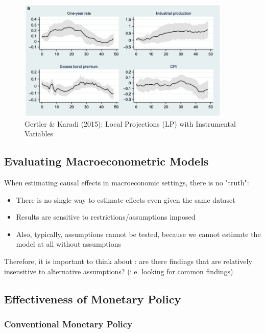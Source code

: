             \begin{figure}[H]
                \centering
                \includegraphics[width=4in]{images/ch8/mp_Gertler_LP.png}
                \caption{Gertler \& Karadi (2015): Local Projections (LP) with Instrumental Variables}
            \end{figure}
            
        \subsection{Evaluating Macroeconometric Models}
            When estimating causal effects in macroeconomic settings, there is no "truth":
            \begin{itemize}
                \item There is no single way to estimate effects even given the same dataset
                \item Results are sensitive to restrictions/assumptions imposed
                \item Also, typically, assumptions cannot be tested, because we cannot estimate the model at all without assumptions
            \end{itemize}
            Therefore, it is important to think about : are there findings that are relatively insensitive to alternative assumptions? (i.e. looking for common findings)

        \subsection{Effectiveness of Monetary Policy}

            \subsubsection{Conventional Monetary Policy}

